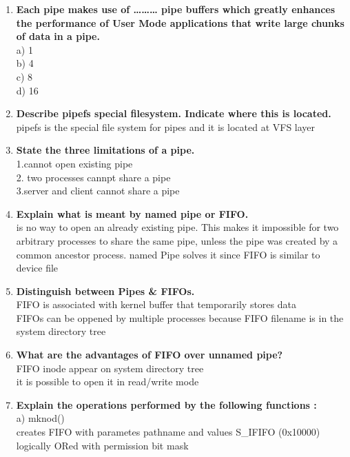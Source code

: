 \documentclass[a4paper,12pt]{article}
\begin{document}
\begin{flushleft}
\begin{enumerate}
\item \textbf{ Each pipe makes use of ……… pipe buffers which greatly enhances the performance of User Mode applications that write large chunks of data in a pipe.}\\
a) 1\\
 b) 4\\
  c) 8 \\
{\color{red}d) 16}\\
\item \textbf{ Describe pipefs special filesystem. Indicate where this is located.}\\
{\color{red}pipefs is the special file system for pipes and it is located at VFS layer}\\
\item \textbf{ State the three limitations of a pipe.}\\
{\color{red}1.cannot open existing pipe\\
2. two processes cannpt share a pipe\\
3.server and client cannot share a pipe}\\
\item \textbf{ Explain what is meant by named pipe or FIFO.}\\
{\color{red}is no way to open an already existing pipe. This makes it
impossible for two arbitrary processes to share the same pipe, unless the pipe was created by a
common ancestor process. named Pipe solves it since FIFO is similar to device file}\\
\item \textbf{ Distinguish between Pipes \& FIFOs.}\\
{\color{red}FIFO is associated with kernel buffer that temporarily stores data \\FIFOs can be oppened by multiple processes because FIFO filename is in the system directory tree}\\
\item \textbf{ What are the advantages of FIFO over unnamed pipe?}\\
{\color{red}FIFO inode appear on system directory tree\\
it is possible to open it in read/write mode}\\
\item \textbf{ Explain the operations performed by the following functions :}\\
a) mknod()\\
{\color{red}creates FIFO  with parametes pathname and values S\_IFIFO (0x10000) logically ORed with permission bit mask}\\

\end{enumerate}
\end{flushleft}
\end{document}

